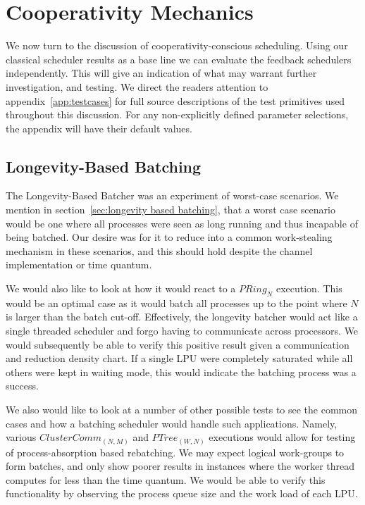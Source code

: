 \section{Cooperativity Mechanics}\label{sec:results-evaluation-feedback}

We now turn to the discussion of cooperativity-conscious scheduling.
Using our classical scheduler results as a base line we can evaluate 
the feedback schedulers independently. This will give an indication of what
may warrant further investigation, and testing. We direct the readers attention
to appendix~\ref{app:testcases} for full source descriptions of the test 
primitives used throughout this discussion. For any non-explicitly defined
parameter selections, the appendix will have their default values.

\subsection{Longevity-Based Batching}\label{sec:results-longbatcher}

The Longevity-Based Batcher was an experiment of worst-case scenarios. We
mention in section~\ref{sec:longevity based batching}, that a worst case 
scenario would be one where all processes were seen as long running and 
thus incapable of being batched. Our desire was for it to reduce into 
a common work-stealing mechanism in these scenarios, and this should hold despite 
the channel implementation or time quantum.

We would also like to look at how it would react to a $PRing_N$ execution. This
would be an optimal case as it would batch all processes up to the point where
$N$ is larger than the batch cut-off. Effectively, the longevity batcher would
act like a single threaded scheduler and forgo having to communicate across
processors. We would subsequently be able to verify this positive result given
a communication and reduction density chart. If a single LPU were completely
saturated while all others were kept in waiting mode, this would indicate the
batching process was a success.

We also would like to look at a number of other possible tests to see the
common cases and how a batching scheduler would handle such applications.
Namely, various $ClusterComm_{(N,M)}$ and $PTree_{(W,N)}$ executions would allow 
for testing of process-absorption based rebatching. We may expect logical
work-groups to form batches, and only show poorer results in instances where
the worker thread computes for less than the time quantum. We would be able
to verify this functionality by observing the process queue size and the work
load of each LPU. 


